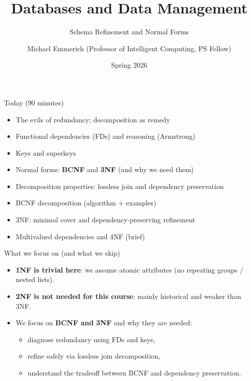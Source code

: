\documentclass[10pt,aspectratio=169]{beamer}
\title{Databases and Data Management}
\subtitle{Schema Refinement and Normal Forms}
\author{Michael Emmerich (Professor of Intelligent Computing, PS Fellow)}
\institute{Faculty of Information Technology\\University of Jyväskylä}
\date{Spring 2026}
\begin{document}
\maketitle

\begin{frame}{Today (90 minutes)}
\begin{itemize}
  \item The evils of redundancy; decomposition as remedy
  \item Functional dependencies (FDs) and reasoning (Armstrong)
  \item Keys and superkeys
  \item Normal forms: \textbf{BCNF} and \textbf{3NF} (and why we need them)
  \item Decomposition properties: lossless join and dependency preservation
  \item BCNF decomposition (algorithm + examples)
  \item 3NF: minimal cover and dependency-preserving refinement
  \item Multivalued dependencies and 4NF (brief)
\end{itemize}
\end{frame}

\begin{frame}{What we focus on (and what we skip)}
\begin{itemize}
  \item \textbf{1NF is trivial here}: we assume atomic attributes (no repeating groups / nested lists).
  \item \textbf{2NF is not needed for this course}: mainly historical and weaker than 3NF.
  \item We focus on \textbf{BCNF and 3NF} and why they are needed:
  \begin{itemize}
    \item diagnose redundancy using FDs and keys,
    \item refine safely via lossless join decomposition,
    \item understand the tradeoff between BCNF and dependency preservation.
  \end{itemize}
\end{itemize}
\end{frame}
\end{document}
